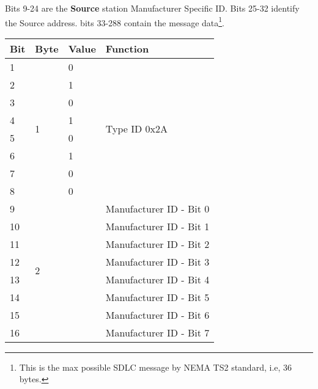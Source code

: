 \documentclass[]{article}
\begin{document}
Bits 9-24 are the \textbf{Source} station Manufacturer Specific ID. Bits 25-32 identify the Source address. bits 33-288 contain the message data\footnote{This is the max possible SDLC message by NEMA TS2 standard, i.e, 36 bytes.}.

\begin{table}[ht]
	\centering
	\begin{tabular}{llll}
		\hline
		\textbf{Bit} & \textbf{Byte}      & \textbf{Value}    & \textbf{Function}             \\ \hline
		1            & \multirow{8}{*}{1} & 0                 & \multirow{8}{*}{Type ID 0x2A} \\
		2            &                    & 1                 &                               \\
		3            &                    & 0                 &                               \\
		4            &                    & 1                 &                               \\
		5            &                    & 0                 &                               \\
		6            &                    & 1                 &                               \\
		7            &                    & 0                 &                               \\
		8            &                    & 0                 &                               \\ \hline
		9            & \multirow{8}{*}{2} & \multirow{8}{*}{} & Manufacturer ID - Bit 0       \\
		10           &                    &                   & Manufacturer ID - Bit 1       \\
		11           &                    &                   & Manufacturer ID - Bit 2       \\
		12           &                    &                   & Manufacturer ID - Bit 3       \\
		13           &                    &                   & Manufacturer ID - Bit 4       \\
		14           &                    &                   & Manufacturer ID - Bit 5       \\
		15           &                    &                   & Manufacturer ID - Bit 6       \\
		16           &                    &                   & Manufacturer ID - Bit 7       \\ \hline

\end{tabular}
\end{table}
\end{document}
